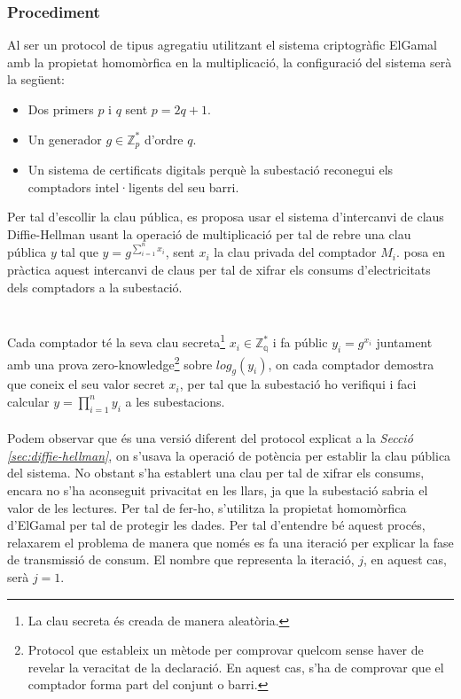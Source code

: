 \subsubsection{Procediment}
Al ser un protocol de tipus agregatiu utilitzant el sistema criptogràfic ElGamal amb la propietat homomòrfica en la multiplicació, la configuració del sistema serà la següent:
\begin{itemize}
	\item Dos primers $p$ i $q$ sent $p = 2q+1$.
	\item Un generador $g \in \mathbb{Z}_p^*$ d'ordre $q$.
	\item Un sistema de certificats digitals perquè la subestació reconegui els comptadors intel·ligents del seu barri.
\end{itemize}
Per tal d'escollir la clau pública, es proposa usar el sistema d'intercanvi de claus Diffie-Hellman usant la operació de multiplicació per tal de rebre una clau pública $y$ tal que $y=g^{\sum_{i=1}^{n} x_i}$, sent $x_i$ la clau privada del comptador $M_i$. \cite{busom} posa en pràctica aquest intercanvi de claus per tal de xifrar els consums d'electricitats dels comptadors a la subestació. 
\\
\\
\\
Cada comptador té la seva clau secreta\footnote{La clau secreta és creada de manera aleatòria.} $x_i \in \mathbb{Z_q^*} $ i fa públic $y_i = g^{x_i}$ juntament amb una prova zero-knowledge\footnote{Protocol que estableix un mètode per comprovar quelcom sense haver de revelar la veracitat de la declaració. En aquest cas, s'ha de comprovar que el comptador forma part del conjunt o barri.} sobre $log_g(y_i)$, on cada comptador demostra que coneix el seu valor secret $x_i$, per tal que la subestació ho verifiqui i faci calcular $y = \prod_{i=1}^{n} y_i$ a les subestacions.
\\
\\
Podem observar que és una versió diferent del protocol explicat a la \textit{Secció \ref{sec:diffie-hellman}}, on s'usava la operació de potència per establir la clau pública del sistema.
No obstant s'ha establert una clau per tal de xifrar els consums, encara no s'ha aconseguit privacitat en les llars, ja que la subestació sabria el valor de les lectures. Per tal de fer-ho, s'utilitza la propietat homomòrfica d'ElGamal per tal de protegir les dades. Per tal d'entendre bé aquest procés, relaxarem el problema de manera que només es fa una iteració per explicar la fase de transmissió de consum. El nombre que representa la iteració, $j$, en aquest cas, serà $j = 1$.
